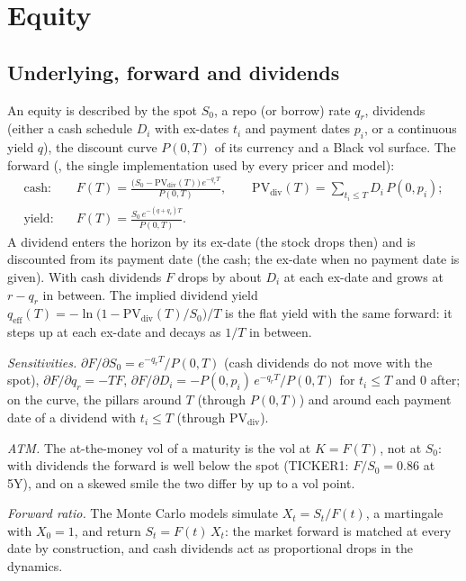 \section{Equity}\label{sec:mp-equity}

\subsection{Underlying, forward and dividends}\label{sec:mp-forward}
An equity is described by the spot $S_0$, a repo (or borrow) rate $q_r$, dividends (either a cash schedule $D_i$ with
ex-dates $t_i$ and payment dates $p_i$, or a continuous yield $q$), the discount curve $P(0,T)$ of its currency and a
Black vol surface.
The forward (, the single implementation used by every pricer and model):
\begin{align*}
  \text{cash:}\quad & F(T) = \frac{\big(S_0 - \mathrm{PV}_{\mathrm{div}}(T)\big)\,e^{-q_r T}}{P(0,T)},\qquad
    \mathrm{PV}_{\mathrm{div}}(T) = \sum_{t_i \le T} D_i\,P(0,p_i); \\
  \text{yield:}\quad & F(T) = \frac{S_0\,e^{-(q + q_r)T}}{P(0,T)}.
\end{align*}
A dividend enters the horizon by its ex-date (the stock drops then) and is discounted from its payment date (the
cash; the ex-date when no payment date is given). With cash dividends $F$ drops by about $D_i$ at each ex-date and
grows at $r - q_r$ in between. The implied dividend
yield $q_{\mathrm{eff}}(T) = -\ln\big(1 - \mathrm{PV}_{\mathrm{div}}(T)/S_0\big)/T$ is the flat yield with the same forward:
it steps up at each ex-date and decays as $1/T$ in between.

\emph{Sensitivities.} $\partial F/\partial S_0 = e^{-q_r T}/P(0,T)$ (cash dividends do not move with the spot),
$\partial F/\partial q_r = -T F$, $\partial F/\partial D_i = -P(0,p_i)\,e^{-q_r T}/P(0,T)$ for $t_i \le T$ and $0$ after;
on the curve, the pillars around $T$ (through $P(0,T)$) and around each payment date of a dividend with $t_i \le T$
(through $\mathrm{PV}_{\mathrm{div}}$).

\emph{ATM.} The at-the-money vol of a maturity is the vol at $K = F(T)$, not at $S_0$: with dividends the forward is
well below the spot (TICKER1: $F/S_0 = 0.86$ at 5Y), and on a skewed smile the two differ by up to a vol point.

\emph{Forward ratio.} The Monte Carlo models simulate $X_t = S_t/F(t)$, a martingale with $X_0 = 1$, and return
$S_t = F(t)\,X_t$: the market forward is matched at every date by construction, and cash dividends act as proportional
drops in the dynamics. 

